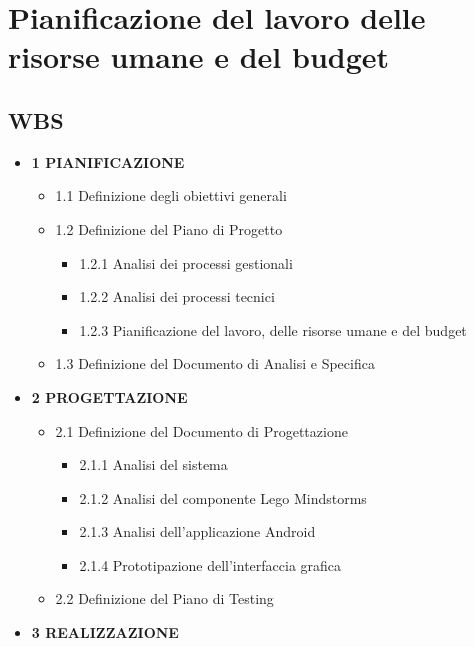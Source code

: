 \documentclass{article}
\begin{document}
  \section{Pianificazione del lavoro delle risorse umane e del
  budget}
  
  \subsection{WBS}
  
  \begin{itemize}
  \item
    \textbf{1 PIANIFICAZIONE}
  
    \begin{itemize}
    \item
      1.1 Definizione degli obiettivi generali
    \item
      1.2 Definizione del Piano di Progetto
  
      \begin{itemize}
      \item
        1.2.1 Analisi dei processi gestionali
      \item
        1.2.2 Analisi dei processi tecnici
      \item
        1.2.3 Pianificazione del lavoro, delle risorse umane e del budget
      \end{itemize}
    \item
      1.3 Definizione del Documento di Analisi e Specifica
    \end{itemize}
  \item
    \textbf{2 PROGETTAZIONE}
  
    \begin{itemize}
    \item
      2.1 Definizione del Documento di Progettazione
  
      \begin{itemize}
      \item
        2.1.1 Analisi del sistema
      \item
        2.1.2 Analisi del componente Lego Mindstorms
      \item
        2.1.3 Analisi dell'applicazione Android
      \item
        2.1.4 Prototipazione dell'interfaccia grafica
      \end{itemize}
    \item
      2.2 Definizione del Piano di Testing
    \end{itemize}
  \item
    \textbf{3 REALIZZAZIONE}
  

\end{itemize}
\end{document}
